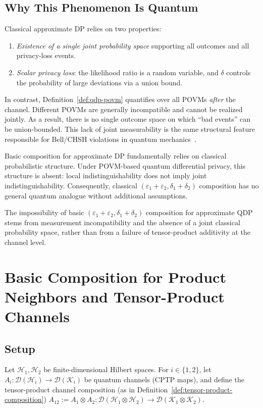 \documentclass[11pt]{article}
\theoremstyle{plain}
\theoremstyle{remark}
\begin{document}
\subsection{Why This Phenomenon Is Quantum}

Classical approximate DP relies on two properties:
\begin{enumerate}
  \item \emph{Existence of a single joint probability space} supporting all outcomes and
        all privacy-loss events.
  \item \emph{Scalar privacy loss}: the likelihood ratio is a random variable, and $\delta$
        controls the probability of large deviations via a union bound.
\end{enumerate}

In contrast, Definition~\ref{def:qdp-povm} quantifies over all POVMs \emph{after} the channel.
Different POVMs are generally incompatible and cannot be realized jointly.
As a result, there is no single outcome space on which ``bad events'' can be union-bounded.
This lack of joint measurability is the same structural feature responsible for Bell/CHSH
violations in quantum mechanics~\citep{NC00,KSV02}.

Basic composition for approximate DP fundamentally relies on classical probabilistic structure.
Under POVM-based quantum differential privacy, this structure is absent: local indistinguishability
does not imply joint indistinguishability. Consequently, classical $(\varepsilon_1+\varepsilon_2,
\delta_1+\delta_2)$ composition has no general quantum analogue without additional assumptions.

The impossibility of basic $(\varepsilon_1+\varepsilon_2,\delta_1+\delta_2)$ composition
for approximate QDP stems from measurement incompatibility and the absence of a joint
classical probability space, rather than from a failure of tensor-product additivity
at the channel level.


\section{Basic Composition for Product Neighbors and Tensor-Product Channels}
\label{sec:basic-comp-product}

\subsection{Setup}

Let $\mathcal{H}_1,\mathcal{H}_2$ be finite-dimensional Hilbert spaces. For $i\in\{1,2\}$,
let $A_i:\mathcal{D}(\mathcal{H}_i)\to\mathcal{D}(\mathcal{K}_i)$ be quantum channels (CPTP maps),
and define the tensor-product channel composition (as in Definition~\ref{def:tensor-product-composition})
$
A_{12} := A_1\otimes A_2:\mathcal{D}(\mathcal{H}_1\otimes\mathcal{H}_2)\to
\mathcal{D}(\mathcal{K}_1\otimes\mathcal{K}_2).
$
\end{document}
